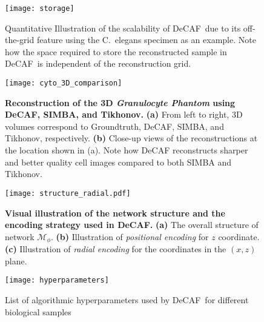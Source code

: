 \documentclass[11pt]{article}
\theoremstyle{plain} %
\def\proposed{DeCAF}
\def\Mcal{{\mathcal{M}}}
\begin{document}
\newpage
\begin{figure}[t!]
\begin{center}
\texttt{[image: storage]}
\end{center}
\caption{Quantitative Illustration of the scalability of \proposed~due to its off-the-grid feature using the C.\ elegans specimen as an example. Note how the space required to store the reconstructed sample in \proposed~is independent of the reconstruction grid.}
\label{Tab:storage}
\end{figure}
\clearpage

\newpage
\begin{figure}[t!]
\begin{center}
\texttt{[image: cyto\_3D\_comparison]}
\end{center}
\caption{\textbf{Reconstruction of the 3D \emph{Granulocyte Phantom} using \proposed, SIMBA, and Tikhonov.} \textbf{(a)} From left to right, 3D volumes correspond to Groundtruth, DeCAF, SIMBA, and Tikhonov, respectively. \textbf{(b)} Close-up views of the reconstructions at the location shown in (a). Note how DeCAF reconstructs sharper and better quality cell images compared to both SIMBA and Tikhonov.}
\label{Fig:Granulocyte3D}
\end{figure}
\clearpage

\newpage
\begin{figure}[t!]
\begin{center}
\texttt{[image: structure\_radial.pdf]}
\end{center}
\caption{
\textbf{Visual illustration of the network structure and the encoding strategy used in \proposed.}
\textbf{(a)} The overall structure of network $\Mcal_\phi$.
\textbf{(b)} Illustration of \emph{positional encoding} for $z$ coordinate.
\textbf{(c)} Illustration of \emph{radial encoding} for the coordinates in the $(x,z)$ plane.}
\label{Fig:network_radial}
\end{figure}
\clearpage

\newpage
\begin{figure}[t!]
\begin{center}
\texttt{[image: hyperparameters]}
\end{center}
\caption{
List of algorithmic hyperparameters used by \proposed~for different biological samples
}
\label{Tab:ListOfParams}
\end{figure}
\clearpage
\end{document}
